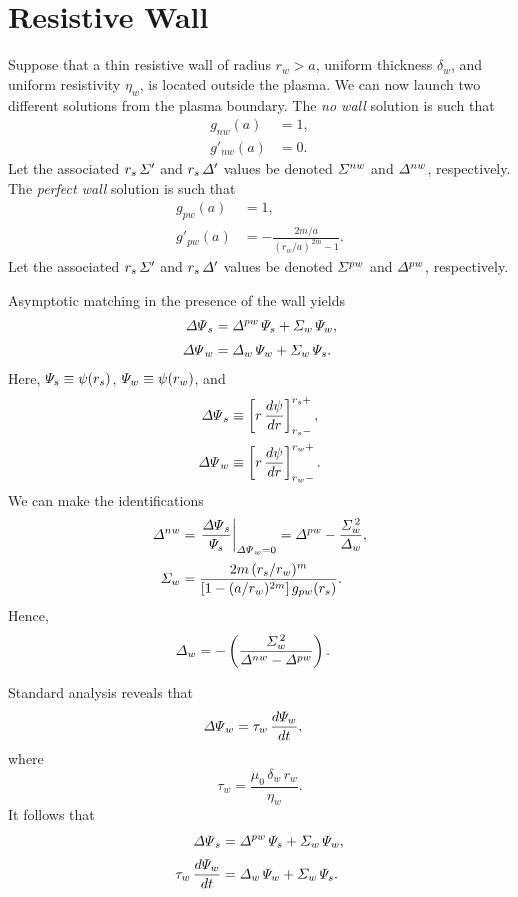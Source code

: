 \documentclass[notitlepage,12pt]{article}
\begin{document}
\section{Resistive Wall}
Suppose that a thin resistive wall of radius $r_w>a$, uniform thickness $\delta_w$, and uniform resistivity $\eta_w$, is located outside the
plasma. We can now launch two different solutions from the plasma boundary.
The {\em no wall}\/ solution is such that
\begin{align}
g_{nw}(a) &= 1,\\[0.5ex]
g'_{nw}(a) &= 0.
\end{align}
Let the associated $r_s\,{\mit\Sigma}'$ and $r_s\,{\mit\Delta}'$ values be denoted ${\mit\Sigma}^{nw}$ and ${\mit\Delta}^{nw}$,
respectively. 
The {\em perfect wall}\/ solution is such that
\begin{align}
g_{pw}(a) &= 1,\\[0.5ex]
g'_{pw}(a) &= -\frac{2m/a}{(r_w/a)^{\,2m}-1}.
\end{align}
Let the associated $r_s\,{\mit\Sigma}'$ and $r_s\,{\mit\Delta}'$ values be denoted ${\mit\Sigma}^{pw}$ and ${\mit\Delta}^{pw}$,
respectively. 

Asymptotic matching in the presence of the wall yields
\begin{align}
{\mit\Delta\Psi}_s&= {\mit\Delta}^{pw}\,{\mit\Psi}_s + {\mit\Sigma}_{w}\,{\mit\Psi}_w,\\[0.5ex]
{\mit\Delta\Psi}_w &= {\mit\Delta}_w\,{\mit\Psi}_w + {\mit\Sigma}_w\,{\mit\Psi}_s.
\end{align}
Here, ${\mit\Psi}_s\equiv \psi(r_s)$, ${\mit\Psi}_w\equiv \psi(r_w)$, and 
\begin{align}
{\mit\Delta\Psi}_s&\equiv\left[r\,\frac{d\psi}{dr}\right]_{r_s-}^{r_s+},\\[0.5ex]
{\mit\Delta\Psi}_w&\equiv\left[r\,\frac{d\psi}{dr}\right]_{r_w-}^{r_w+}.
\end{align}
  We can
make the identifications
\begin{align}
{\mit\Delta}^{nw} &= \left.\frac{{\mit\Delta\Psi}_s}{{\mit\Psi}_s}\right|_{{\mit\Delta\Psi}_w=0}={\mit\Delta}^{pw}- \frac{{\mit\Sigma}_w^{\,2}}{{\mit\Delta}_w},\\[0.5ex]
{\mit\Sigma}_w&= \frac{2m\,(r_s/r_w)^m}{[1-(a/r_w)^{2m}]\,g_{pw}(r_s)}.
\end{align}
Hence,
\begin{align}
{\mit\Delta}_w &= -\left(\frac{{\mit\Sigma}_w^{\,2}}{{\mit\Delta}^{nw} -{\mit\Delta}^{pw}}\right).
\end{align}

Standard analysis reveals that 
\begin{align}
{\mit\Delta\Psi}_w &= \tau_w\,\frac{d{\mit\Psi}_w}{dt},
\end{align}
where
\begin{equation}
\tau_w = \frac{\mu_0\,\delta_w\,r_w}{\eta_w}.
\end{equation}
It follows that
\begin{align}
{\mit\Delta\Psi}_s &= {\mit\Delta}^{pw}\,{\mit\Psi}_s + {\mit\Sigma}_w\,{\mit\Psi}_w,\\[0.5ex]
\tau_w\,\frac{d{\mit\Psi}_w}{dt} &= {\mit\Delta}_w\,{\mit\Psi}_w + {\mit\Sigma}_w\,{\mit\Psi}_s.
\end{align}
\end{document}
